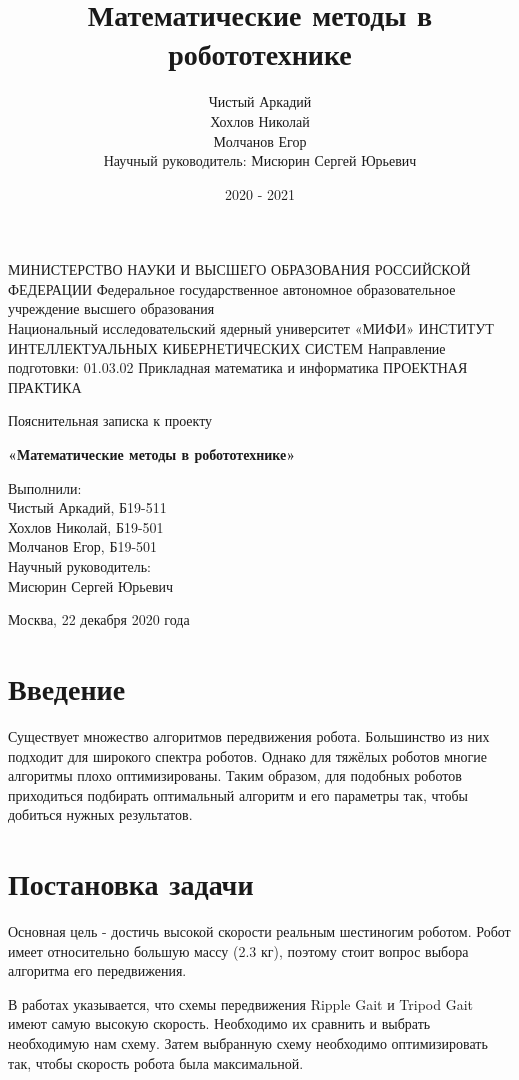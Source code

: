 \documentclass{article}
\title{Математические методы в робототехнике}
\author{
Чистый Аркадий\\
Хохлов Николай\\
Молчанов Егор\\
Научный руководитель: Мисюрин Сергей Юрьевич
}
\date{2020 - 2021}
\begin{document}
\begin{center}
МИНИСТЕРСТВО НАУКИ И ВЫСШЕГО ОБРАЗОВАНИЯ РОССИЙСКОЙ ФЕДЕРАЦИИ
\vfill
Федеральное государственное автономное образовательное учреждение высшего образования\\
\bigskip
Национальный исследовательский ядерный университет «МИФИ»
\vfill
ИНСТИТУТ ИНТЕЛЛЕКТУАЛЬНЫХ КИБЕРНЕТИЧЕСКИХ СИСТЕМ
\vfill
Направление подготовки: 01.03.02 Прикладная математика и информатика
\vfill
ПРОЕКТНАЯ ПРАКТИКА
\vfill
{\large Пояснительная записка к проекту

\medskip
{\bfseries \Large «Математические методы в робототехнике»}}
\vfill
\end{center}
\begin{flushright}
Выполнили:\\
	Чистый Аркадий, Б19-511\\
	Хохлов Николай, Б19-501\\
	Молчанов Егор, Б19-501\\
\medskip
Научный руководитель:\\
	Мисюрин Сергей Юрьевич
\end{flushright}
\vfill
\vfill
\begin{center}
Москва, 22 декабря 2020 года
\end{center}
\vfill
\vfill
\pagebreak

\tableofcontents
\newpage

\section{Введение}
Существует множество алгоритмов передвижения робота. Большинство из них подходит для широкого спектра роботов. Однако для тяжёлых роботов многие алгоритмы плохо оптимизированы. Таким образом, для подобных роботов приходиться подбирать оптимальный алгоритм и его параметры так, чтобы добиться нужных результатов.

\section{Постановка задачи}
Основная цель - достичь высокой скорости реальным шестиногим роботом. Робот имеет относительно большую массу (2.3 кг), поэтому стоит вопрос выбора алгоритма его передвижения.

В работах \cite{ref1,ref7} указывается, что схемы передвижения Ripple Gait и Tripod Gait имеют самую высокую скорость. Необходимо их сравнить и выбрать необходимую нам схему. Затем выбранную схему необходимо оптимизировать так, чтобы скорость робота была максимальной.
\end{document}
